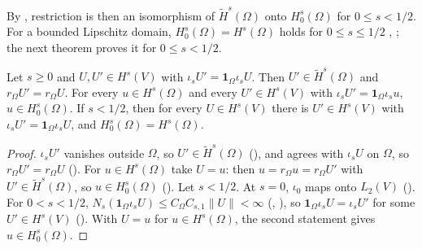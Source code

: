 By , restriction is then an isomorphism of
$\tilde H^s(\Omega)$ onto $H^s_0(\Omega)$ for $0 \leq s < 1/2$. For a bounded Lipschitz domain,
$H^s_0(\Omega) = H^s(\Omega)$ holds for $0 \leq s \leq 1/2$ \cite[Theorem 1.4.2.4]{Grisvard},
\cite[Theorem 3.40]{McLean}; the next theorem proves it for $0 \leq s < 1/2$.

\begin{theorem}[$H^s_0(\Omega) = H^s(\Omega)$ for small smoothness]
\label{thm:zero-boundary-small}
\leanok
{}
Let $s \geq 0$ and $U, U' \in H^s(V)$ with $\iota_s U' = \mathbf 1_\Omega \iota_s U$. Then
$U' \in \tilde H^s(\Omega)$ and $r_\Omega U' = r_\Omega U$. For every $u \in H^s(\Omega)$ and
every $U' \in H^s(V)$ with $\iota_s U' = \mathbf 1_\Omega \iota_s u$, $u \in H^s_0(\Omega)$. If
$s < 1/2$, then for every $U \in H^s(V)$ there is $U' \in H^s(V)$ with
$\iota_s U' = \mathbf 1_\Omega \iota_s U$, and $H^s_0(\Omega) = H^s(\Omega)$.
\end{theorem}

\begin{proof}
\leanok
$\iota_s U'$ vanishes outside $\Omega$, so $U' \in \tilde H^s(\Omega)$
(), and agrees with $\iota_s U$ on $\Omega$, so
$r_\Omega U' = r_\Omega U$ (). For $u \in H^s(\Omega)$ take
$U = u$: then $u = r_\Omega u = r_\Omega U'$ with $U' \in \tilde H^s(\Omega)$, so
$u \in H^s_0(\Omega)$ (). Let $s < 1/2$. At $s = 0$,
$\iota_0$ maps onto $L_2(V)$ (). For $0 < s < 1/2$,
$N_s(\mathbf 1_\Omega \iota_s U) \leq C_\Omega C_{s,1} \|U\| < \infty$
(, ), so
$\mathbf 1_\Omega \iota_s U = \iota_s U'$ for some $U' \in H^s(V)$
(). With $U = u$ for $u \in H^s(\Omega)$, the second statement
gives $u \in H^s_0(\Omega)$.
\end{proof}

